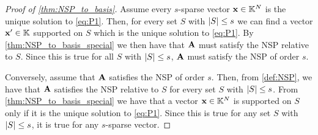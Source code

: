 \begin{proof}[Proof of \cref{thm:NSP_to_basis}]
	Assume every $ s $-sparse vector $ \mathbf{x}\in\mathbb{K}^{N} $ is the unique solution to \eqref{eq:P1}. Then, for every set $ S $ with $ \left|S\right| \leq s $ we can find a vector $ \mathbf{x}'\in\mathbb{K} $ supported on $ S $ which is the unique solution to \eqref{eq:P1}. By \cref{thm:NSP_to_basis_special} we then have that $ \mathbf{A} $ must satisfy the NSP relative to $ S $. Since this is true for all $ S $ with $ \left|S\right| \leq s $, $ \mathbf{A} $ must satisfy the NSP of order $ s $.
	
	Conversely, assume that $ \mathbf{A} $ satisfies the NSP of order $ s $. Then, from \cref{def:NSP}, we have that $ \mathbf{A} $ satisfies the NSP relative to $ S $ for every set $ S $ with $ \left|S\right| \leq s $. From \cref{thm:NSP_to_basis_special} we have that a vector $ \mathbf{x}\in\mathbb{K}^{N} $ is supported on $ S $ only if it is the unique solution to \eqref{eq:P1}. Since this is true for any set $ S $ with $ \left|S\right| \leq s $, it is true for any $ s $-sparse vector.
\end{proof} 








